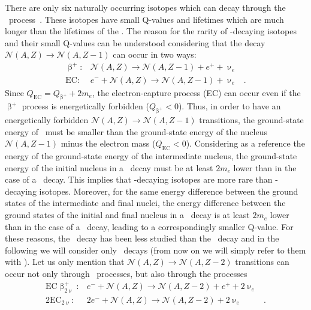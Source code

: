 There are only six naturally occurring isotopes which can decay through the \nnbbp\
process~\cite{Haxton1985}. These isotopes have small Q-values and lifetimes which are much
longer than the lifetimes of the \nnbbm. The reason for the rarity of \nnbbp-decaying
isotopes and their small Q-values can be understood considering that the decay
$\mathcal{N}(A,Z) \rightarrow \mathcal{N}(A,Z-1)$ can occur in two ways:
\[
  \begin{array}{lrl}
    \upbeta^+: &
      \mathcal{N}(A,Z) \rightarrow \mathcal{N}(A,Z-1) + e^+ + \upnu_e & \\
    \text{EC}: &
      e^- + \mathcal{N}(A,Z) \rightarrow \mathcal{N}(A,Z-1) + \upnu_e &.
  \end{array}
\]
Since $Q_\text{EC} = Q_{\upbeta^+}+2m_e$, the electron-capture process (EC) can occur even
if the $\upbeta^+$ process is energetically forbidden ($Q_{\upbeta^+} < 0$). Thus, in
order to have an energetically forbidden $\mathcal{N}(A,Z)\rightarrow\mathcal{N}(A,Z-1)$
transitions, the ground-state energy of \NAZ\ must be smaller than the ground-state energy
of the nucleus $\mathcal{N}(A,Z-1)$ minus the electron mass ($Q_\text{EC}<0$).
Considering as a reference the energy of the ground-state energy of the intermediate
nucleus, the ground-state energy of the initial nucleus in a \nnbbp\ decay must be at
least $2m_e$ lower than in the case of a \nnbbm\ decay. This implies that \nnbbp-decaying
isotopes are more rare than \nnbbm-decaying isotopes. Moreover, for the same energy
difference between the ground states of the intermediate and final nuclei, the energy
difference between the ground states of the initial and final nucleus in a \nnbbp\ decay
is at least $2m_e$ lower than in the case of a \nnbbm\ decay, leading to a correspondingly
smaller Q-value. For these reasons, the \nnbbp\ decay has been less studied than the
\nnbbm\ decay and in the following we will consider only \nnbbm\ decays (from now on we
will simply refer to them with \nnbb). Let us only mention that $\mathcal{N}(A,Z)
\rightarrow \mathcal{N}(A,Z-2)$ transitions can occur not only through \nnbbp\ processes,
but also through the processes
\[
  \begin{array}{lrl}
    \text{EC}\upbeta^+_{2\upnu}: &
      e^- + \mathcal{N}(A,Z) \rightarrow \mathcal{N}(A,Z-2) + e^+ + 2\upnu_e & \\
    2\text{EC}_{2\upnu}: &
      2e^- + \mathcal{N}(A,Z) \rightarrow \mathcal{N}(A,Z-2) + 2\upnu_e &.
  \end{array}
\]

